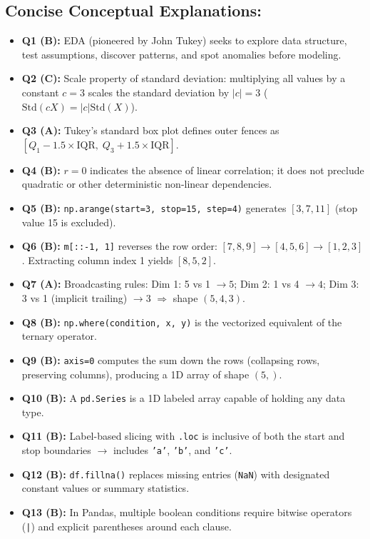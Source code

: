 \documentclass[11pt,a4paper]{article}
\begin{document}
\subsection*{Concise Conceptual Explanations:}
\begin{itemize}[leftmargin=*,itemsep=1.5pt]
  \item \textbf{Q1 (B):} EDA (pioneered by John Tukey) seeks to explore data structure, test assumptions, discover patterns, and spot anomalies before modeling.
  \item \textbf{Q2 (C):} Scale property of standard deviation: multiplying all values by a constant $c = 3$ scales the standard deviation by $|c| = 3$ ($\text{Std}(cX) = |c|\text{Std}(X)$).
  \item \textbf{Q3 (A):} Tukey's standard box plot defines outer fences as $[Q_1 - 1.5\times\text{IQR}, \; Q_3 + 1.5\times\text{IQR}]$.
  \item \textbf{Q4 (B):} $r = 0$ indicates the absence of linear correlation; it does not preclude quadratic or other deterministic non-linear dependencies.
  \item \textbf{Q5 (B):} \texttt{np.arange(start=3, stop=15, step=4)} generates $[3, 7, 11]$ (stop value 15 is excluded).
  \item \textbf{Q6 (B):} \texttt{m[::-1, 1]} reverses the row order: $[7, 8, 9] \rightarrow [4, 5, 6] \rightarrow [1, 2, 3]$. Extracting column index 1 yields $[8, 5, 2]$.
  \item \textbf{Q7 (A):} Broadcasting rules: Dim 1: 5 vs 1 $\rightarrow 5$; Dim 2: 1 vs 4 $\rightarrow 4$; Dim 3: 3 vs 1 (implicit trailing) $\rightarrow 3$ $\Rightarrow$ shape $(5, 4, 3)$.
  \item \textbf{Q8 (B):} \texttt{np.where(condition, x, y)} is the vectorized equivalent of the ternary operator.
  \item \textbf{Q9 (B):} \texttt{axis=0} computes the sum down the rows (collapsing rows, preserving columns), producing a 1D array of shape $(5,)$.
  \item \textbf{Q10 (B):} A \texttt{pd.Series} is a 1D labeled array capable of holding any data type.
  \item \textbf{Q11 (B):} Label-based slicing with \texttt{.loc} is inclusive of both the start and stop boundaries $\rightarrow$ includes \texttt{'a'}, \texttt{'b'}, and \texttt{'c'}.
  \item \textbf{Q12 (B):} \texttt{df.fillna()} replaces missing entries (\texttt{NaN}) with designated constant values or summary statistics.
  \item \textbf{Q13 (B):} In Pandas, multiple boolean conditions require bitwise operators (\texttt{|}) and explicit parentheses around each clause.

\end{itemize}
\end{document}
